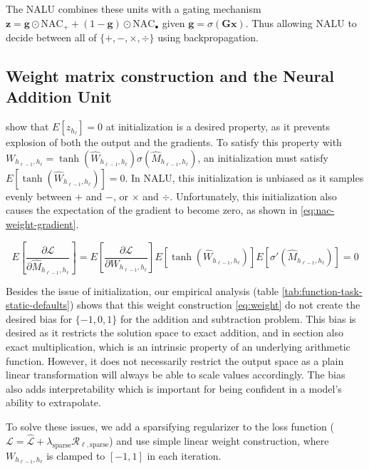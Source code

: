 The NALU combines these units with a gating mechanism $\mathbf{z} = \mathbf{g} \odot \text{NAC}_{+} + (1 - \mathbf{g}) \odot \text{NAC}_{\bullet}$ given $\mathbf{g} = \sigma(\mathbf{G} \mathbf{x})$. Thus allowing NALU to decide between all of $\{+, -, \times, \div\}$ using backpropagation.

\subsection{Weight matrix construction  and the Neural Addition Unit}\label{sssec:weight}

\citet{glorot-initialization} show that $E[z_{h_\ell}] = 0$ at initialization is a desired property, as it prevents explosion of both the output and the gradients.
To satisfy this property with $W_{h_{\ell-1},h_\ell} = \tanh(\hat{W}_{h_{\ell-1},h_\ell}) \sigma(\hat{M}_{h_{\ell-1},h_\ell})$, an initialization must satisfy $E[\tanh(\hat{W}_{h_{\ell-1},h_\ell})] = 0$.
In NALU, this initialization is unbiased as it samples evenly between $+$ and $-$, or $\times$ and $\div$.
Unfortunately, this initialization also causes the expectation of the gradient to become zero, as shown in \eqref{eq:nac-weight-gradient}.

\begin{equation}
E\left[\frac{\partial \mathcal{L}}{\partial \hat{M}_{h_{\ell-1},h_\ell}}\right] = E\left[\frac{\partial \mathcal{L}}{\partial W_{h_{\ell-1},h_\ell}}\right] E\left[\tanh(\hat{W}_{h_{\ell-1},h_\ell})\right] E\left[\sigma'(\hat{M}_{h_{\ell-1},h_\ell})\right] = 0
\label{eq:nac-weight-gradient}
\end{equation}

Besides the issue of initialization, our empirical analysis (table \ref{tab:function-task-static-defaults}) shows that this weight construction \eqref{eq:weight} do not create the desired bias for $\{-1, 0, 1\}$ for the addition and subtraction problem. This bias is desired as it restricts the solution space to exact addition, and in section \label{sec:method:nmu} also exact multiplication, which is an intrinsic property of an underlying arithmetic function. However, it does not necessarily restrict the output space as a plain linear transformation will always be able to scale values accordingly. The bias also adds interpretability which is important for being confident in a model’s ability to extrapolate.

To solve these issues, we add a sparsifying regularizer to the loss function ($\mathcal{L} = \hat{\mathcal{L}} + \lambda_{\mathrm{sparse}} \mathcal{R}_{\ell,\mathrm{sparse}}$) and use simple linear weight construction, where $W_{h_{\ell-1},h_\ell}$ is clamped to $[-1, 1]$ in each iteration.

